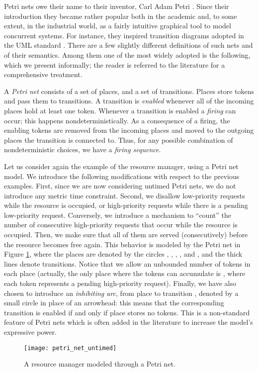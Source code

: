 Petri nets owe their name to their inventor, Carl Adam Petri \cite{Pet63}.
Since their introduction they became rather popular 
both in the academic and, to some extent, in the industrial world, 
as a fairly intuitive graphical tool to model concurrent systems. 
For instance, they inspired transition diagrams adopted in the 
UML standard \cite{UML05,UML04,EPLF03}. There are a few slightly 
different definitions of such nets and of their semantics. Among 
them one of the most widely adopted is the following, which we 
present informally; the reader is referred to the literature \cite{Pet81,Rei85}
for a comprehensive treatment.

A \emph{Petri net} consists of a set of places, and a set of transitions. 
Places store tokens and pass them to transitions. A transition 
is \emph{enabled} whenever all of the incoming places hold at least 
one token. Whenever a transition is enabled a \emph{firing} can 
occur; this happens nondeterministically. As a consequence of 
a firing, the enabling tokens are removed from the incoming places 
and moved to the outgoing places the transition is connected 
to. Thus, for any possible combination of nondeterministic choices, 
we have a \emph{firing sequence}.

Let us consider again the example of the resource manager, using 
a Petri net model. We introduce the following modifications with 
respect to the previous examples. First, since we are now considering 
untimed Petri nets, we do not introduce any metric time constraint. 
Second, we disallow low-priority requests while the resource 
is occupied, or high-priority requests while there is a pending 
low-priority request. Conversely, we introduce a mechanism to 
``count'' the number of consecutive high-priority requests that 
occur while the resource is occupied. Then, we make sure that 
all of them are served (consecutively) before the resource becomes 
free again. This behavior is modeled by the Petri net in Figure \ref{fig:petri_net_untimed}, 
where the places are denoted by the circles , , , , 
and , and the thick lines denote transitions. Notice that 
we allow an unbounded number of tokens in each place (actually, 
the only place where the tokens can accumulate is , 
where each token represents a pending high-priority request). 
Finally, we have also chosen to introduce an \emph{inhibiting arc}, 
from place  to transition , denoted by a small circle 
in place of an arrowhead: this means that the corresponding transition 
is enabled if and only if place  stores no tokens. This 
is a non-standard feature of Petri nets which is often added 
in the literature to increase the model's expressive power.
\begin{figure}[htb!]
	 \centering
	 \texttt{[image: petri\_net\_untimed]}
	 \caption{A resource manager modeled through a Petri net.}
	 \label{fig:petri_net_untimed}
\end{figure}

